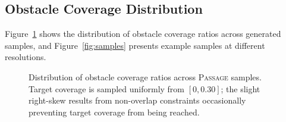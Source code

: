 \documentclass{article}
\newcommand{\dataset}{\textsc{Passage}}
\begin{document}
\subsection{Obstacle Coverage Distribution}

Figure~\ref{fig:obstacle_dist} shows the distribution of obstacle coverage ratios across generated samples, and Figure~\ref{fig:samples} presents example samples at different resolutions.

\begin{figure}[h]
\centering
\caption{Distribution of obstacle coverage ratios across \dataset{} samples. Target coverage is sampled uniformly from $[0, 0.30]$; the slight right-skew results from non-overlap constraints occasionally preventing target coverage from being reached.}
\label{fig:obstacle_dist}
\end{figure}
\end{document}
